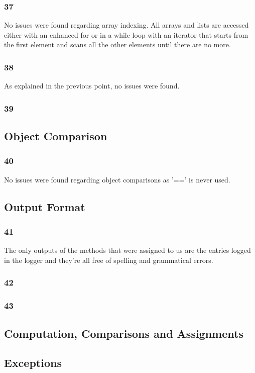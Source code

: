 \documentclass{article}
\begin{document}
\subsubsection{37}
No issues were found regarding array indexing. All arrays and lists are accessed 
either with an enhanced for or in a while loop with an iterator that starts from the
 first element and scans all the other elements until there are no more.
\subsubsection{38}
As explained in the previous point, no issues were found.
\subsubsection{39}
\subsection{Object Comparison}
\subsubsection{40}
No issues were found regarding object comparisons as '==' is never used.
\subsection{Output Format}
\subsubsection{41}
The only outputs of the methods that were assigned to us are the
 entries logged in the logger and they're all free of spelling
 and grammatical errors.
\subsubsection{42}
\subsubsection{43}
\subsection{Computation, Comparisons and Assignments}
\subsection{Exceptions}
\end{document}

